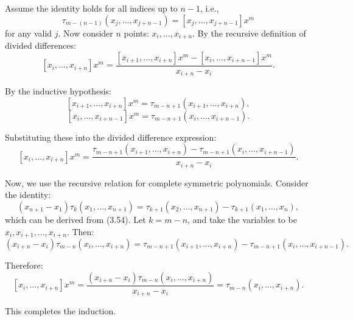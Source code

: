 \documentclass[a4paper]{article}
\begin{document}
Assume the identity holds for all indices up to \( n-1 \), i.e.,
\[
\tau_{m-(n-1)}(x_j, \ldots, x_{j+n-1}) = [x_j, \ldots, x_{j+n-1}] x^m
\]
for any valid \( j \). Now consider \( n \) points: \( x_i, \ldots, x_{i+n} \). By the recursive definition of divided differences:
\[
[x_i, \ldots, x_{i+n}] x^m = \frac{ [x_{i+1}, \ldots, x_{i+n}] x^m - [x_i, \ldots, x_{i+n-1}] x^m }{ x_{i+n} - x_i }.
\]

By the inductive hypothesis:
\[
[x_{i+1}, \ldots, x_{i+n}] x^m = \tau_{m-n+1}(x_{i+1}, \ldots, x_{i+n}),
\]
\[
[x_i, \ldots, x_{i+n-1}] x^m = \tau_{m-n+1}(x_i, \ldots, x_{i+n-1}).
\]

Substituting these into the divided difference expression:
\[
[x_i, \ldots, x_{i+n}] x^m = \frac{ \tau_{m-n+1}(x_{i+1}, \ldots, x_{i+n}) - \tau_{m-n+1}(x_i, \ldots, x_{i+n-1}) }{ x_{i+n} - x_i }.
\]

Now, we use the recursive relation for complete symmetric polynomials. Consider the identity:
\[
(x_{n+1} - x_1) \tau_k(x_1, \ldots, x_{n+1}) = \tau_{k+1}(x_2, \ldots, x_{n+1}) - \tau_{k+1}(x_1, \ldots, x_n),
\]
which can be derived from (3.54). Let \( k = m-n \), and take the variables to be \( x_i, x_{i+1}, \ldots, x_{i+n} \). Then:
\[
(x_{i+n} - x_i) \tau_{m-n}(x_i, \ldots, x_{i+n}) = \tau_{m-n+1}(x_{i+1}, \ldots, x_{i+n}) - \tau_{m-n+1}(x_i, \ldots, x_{i+n-1}).
\]

Therefore:
\[
[x_i, \ldots, x_{i+n}] x^m = \frac{ (x_{i+n} - x_i) \tau_{m-n}(x_i, \ldots, x_{i+n}) }{ x_{i+n} - x_i } = \tau_{m-n}(x_i, \ldots, x_{i+n}).
\]

This completes the induction.




\end{document}
